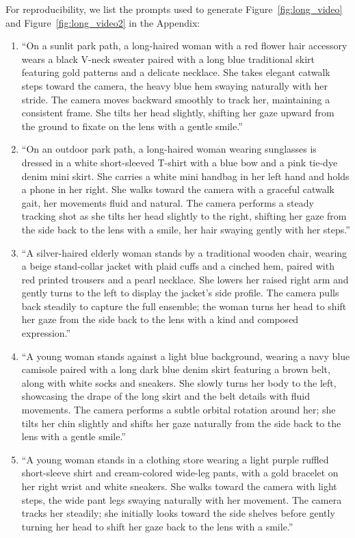 \documentclass{llmxive}
\begin{document}
For reproducibility, we list the prompts used to generate Figure~\ref{fig:long_video} and Figure~\ref{fig:long_video2} in the Appendix:
\begin{enumerate}
\item ``On a sunlit park path, a long-haired woman with a red flower hair accessory wears a black V-neck sweater paired with a long blue traditional skirt featuring gold patterns and a delicate necklace. She takes elegant catwalk steps toward the camera, the heavy blue hem swaying naturally with her stride. The camera moves backward smoothly to track her, maintaining a consistent frame. She tilts her head slightly, shifting her gaze upward from the ground to fixate on the lens with a gentle smile.''
% 
\item ``On an outdoor park path, a long-haired woman wearing sunglasses is dressed in a white short-sleeved T-shirt with a blue bow and a pink tie-dye denim mini skirt. She carries a white mini handbag in her left hand and holds a phone in her right. She walks toward the camera with a graceful catwalk gait, her movements fluid and natural. The camera performs a steady tracking shot as she tilts her head slightly to the right, shifting her gaze from the side back to the lens with a smile, her hair swaying gently with her steps.''
% 
\item ``A silver-haired elderly woman stands by a traditional wooden chair, wearing a beige stand-collar jacket with plaid cuffs and a cinched hem, paired with red printed trousers and a pearl necklace. She lowers her raised right arm and gently turns to the left to display the jacket's side profile. The camera pulls back steadily to capture the full ensemble; the woman turns her head to shift her gaze from the side back to the lens with a kind and composed expression.''
% 
\item ``A young woman stands against a light blue background, wearing a navy blue camisole paired with a long dark blue denim skirt featuring a brown belt, along with white socks and sneakers. She slowly turns her body to the left, showcasing the drape of the long skirt and the belt details with fluid movements. The camera performs a subtle orbital rotation around her; she tilts her chin slightly and shifts her gaze naturally from the side back to the lens with a gentle smile.''
\item ``A young woman stands in a clothing store wearing a light purple ruffled short-sleeve shirt and cream-colored wide-leg pants, with a gold bracelet on her right wrist and white sneakers. She walks toward the camera with light steps, the wide pant legs swaying naturally with her movement. The camera tracks her steadily; she initially looks toward the side shelves before gently turning her head to shift her gaze back to the lens with a smile.''

\end{enumerate}
\end{document}
